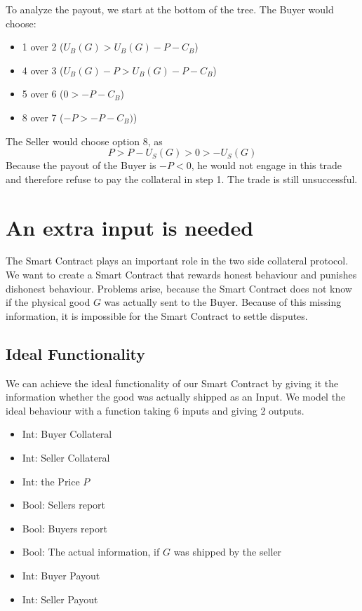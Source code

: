 \documentclass{cacthesis}
\begin{document}
To analyze the payout, we start at the bottom of the tree. The Buyer would choose:
\begin{itemize}
    \item 1 over 2 ($U_B(G) > U_B(G) -P -C_B$)
    \item 4 over 3 ($U_B(G) - P > U_B(G) -P -C_B$)
    \item 5 over 6 ($0 > -P -C_B$)
    \item 8 over 7 ($-P > -P -C_B)$)
\end{itemize}
The Seller would choose option 8, as 
\[P>P-U_S(G)>0>-U_S(G)\]
Because the payout of the Buyer is $-P<0$, he would not engage in this trade and therefore refuse to pay the collateral in step 1. The trade is still unsuccessful.
\section{An extra input is needed}
The Smart Contract plays an important role in the two side collateral protocol. We want to create a Smart Contract that rewards honest behaviour and punishes dishonest behaviour.\newline
Problems arise, because the Smart Contract does not know if the physical good $G$ was actually sent to the Buyer. Because of this missing information, it is impossible for the Smart Contract to settle disputes.
\subsection{Ideal Functionality}
We can achieve the ideal functionality of our Smart Contract by giving it the information whether the good was actually shipped as an Input. We model the ideal behaviour with a function taking 6 inputs and giving 2 outputs.

\begin{itemize}
\item{Int: Buyer Collateral}
\item{Int: Seller Collateral}
\item{Int: the Price $P$}
\item{Bool: Sellers report}
\item{Bool: Buyers report}
\item{Bool: The actual information, if $G$ was shipped by the seller}
\end{itemize}

\begin{itemize}
\item{Int: Buyer Payout}
\item{Int: Seller Payout}
\end{itemize}
\end{document}
